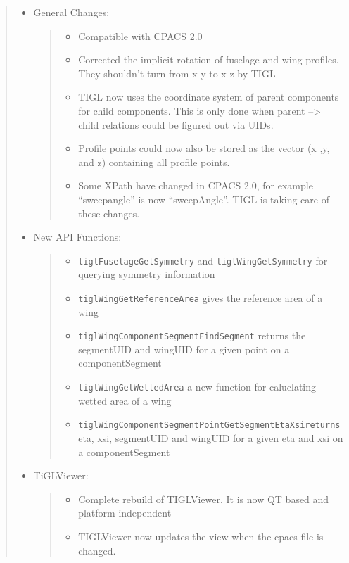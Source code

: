\documentclass[]{scrartcl}
\begin{document}
\begin{quote}
\begin{itemize}
\item
  General Changes:

  \begin{quote}
  \begin{itemize}
  \itemsep1pt\parskip0pt
  \item
    Compatible with CPACS 2.0
  \item
    Corrected the implicit rotation of fuselage and wing profiles. They
    shouldn't turn from x-y to x-z by TIGL
  \item
    TIGL now uses the coordinate system of parent components for child
    components. This is only done when parent --\textgreater{} child
    relations could be figured out via UIDs.
  \item
    Profile points could now also be stored as the vector (x ,y, and z)
    containing all profile points.
  \item
    Some XPath have changed in CPACS 2.0, for example ``sweepangle'' is
    now ``sweepAngle''. TIGL is taking care of these changes.
  \end{itemize}
  \end{quote}
\item
  New API Functions:

  \begin{quote}
  \begin{itemize}
  \itemsep1pt\parskip0pt
  \item
    \texttt{tiglFuselageGetSymmetry} and \texttt{tiglWingGetSymmetry}
    for querying symmetry information
  \item
    \texttt{tiglWingGetReferenceArea} gives the reference area of a wing
  \item
    \texttt{tiglWingComponentSegmentFindSegment} returns the segmentUID
    and wingUID for a given point on a componentSegment
  \item
    \texttt{tiglWingGetWettedArea} a new function for caluclating wetted
    area of a wing
  \item
    \texttt{tiglWingComponentSegmentPointGetSegmentEtaXsireturns} eta,
    xsi, segmentUID and wingUID for a given eta and xsi on a
    componentSegment
  \end{itemize}
  \end{quote}
\item
  TiGLViewer:

  \begin{quote}
  \begin{itemize}
  \itemsep1pt\parskip0pt
  \item
    Complete rebuild of TIGLViewer. It is now QT based and platform
    independent
  \item
    TIGLViewer now updates the view when the cpacs file is changed.
  \end{itemize}
  \end{quote}
\end{itemize}
\end{quote}
\end{document}
